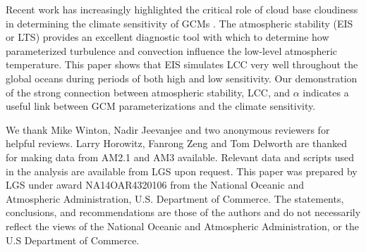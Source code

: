 Recent work has increasingly highlighted the critical role of cloud base cloudiness in determining the climate sensitivity of GCMs 
\citep{Brient_etal_2015, Vial_etal_2017}.   
The atmospheric stability (EIS or LTS) provides an excellent diagnostic tool with which to determine how parameterized turbulence and convection influence the low-level atmospheric temperature.  This paper shows that EIS simulates LCC very well throughout the global oceans during periods of both high and low sensitivity.   Our demonstration of the strong connection between atmospheric stability, LCC, and $\alpha$ indicates a useful link between GCM parameterizations and the climate sensitivity.  






\acknowledgments
We thank Mike Winton, Nadir Jeevanjee and two anonymous reviewers for helpful reviews.  Larry Horowitz,  Fanrong Zeng and Tom Delworth are thanked for making data from 
AM2.1 and AM3 available.  Relevant data and scripts used in the analysis are available from LGS upon request.  This paper was prepared by LGS under award NA14OAR4320106 
from the National Oceanic and Atmospheric Administration, U.S. Department of Commerce.  The statements, conclusions, and recommendations
are those of the authors and do not necessarily reflect the views of the National Oceanic and Atmospheric Administration, or the 
U.S Department of Commerce.





